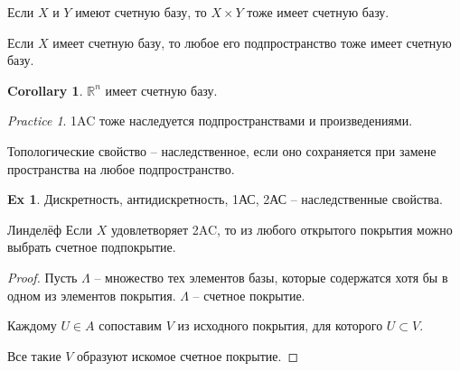 \documentclass[11pt]{book}
\newcommand{\R}{\mathbb{R}}
\theoremstyle{definition}
\theoremstyle{plain}
\theoremstyle{plain}
\theoremstyle{definition}
\newtheorem*{ex}{Ex}
\newtheorem*{cor}{Corollary}
\theoremstyle{remark}
\newtheorem*{prac}{Practice}
\begin{document}
\begin{thm}
    Если $ X$ и $ Y$ имеют счетную базу, то $ X \times  Y$ тоже имеет счетную базу.
\end{thm}
\begin{thm}
    Если $ X$ имеет счетную базу, то любое его подпространство тоже имеет счетную базу.
\end{thm}
\begin{cor}
    $ \R^{n}$ имеет счетную базу.
\end{cor}
\begin{prac}
    1AC тоже наследуется подпространствами и произведениями.
\end{prac}
\begin{defn}
    Топологические свойство -- наследственное, если оно сохраняется при замене пространства на любое подпространство.
\end{defn}
\begin{ex}
    Дискретность, антидискретность, 1АС, 2АС -- наследственные свойства.
\end{ex}
\begin{thm}{Линделёф}
    Если $ X$ удовлетворяет 2AC, то из любого открытого покрытия можно выбрать счетное подпокрытие.
\end{thm}
\begin{proof}
    Пусть  $ \Lambda $ -- множество тех элементов базы, которые содержатся хотя бы в одном из элементов покрытия. $ \Lambda$ -- счетное покрытие.

    Каждому $ U \in A$ сопоставим $ V$ из исходного покрытия, для которого  $ U \subset V$.

    Все такие $ V$ образуют искомое счетное покрытие.
\end{proof}
\end{document}
